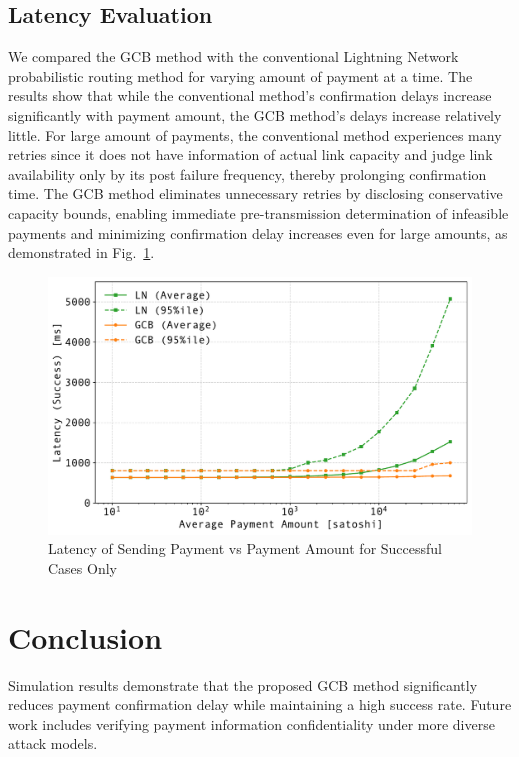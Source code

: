 \documentclass[conference]{IEEEtran}
\begin{document}
\subsection{Latency Evaluation}

We compared the GCB method with the conventional Lightning Network probabilistic routing method for varying amount of payment at a time.
The results show that while the conventional method's confirmation delays increase significantly with payment amount, the GCB method's delays increase relatively little.
For large amount of payments, the conventional method experiences many retries since it does not have information of actual link capacity and judge link availability only by its post failure frequency, thereby prolonging confirmation time.
The GCB method eliminates unnecessary retries by disclosing conservative capacity bounds, enabling immediate pre-transmission determination of infeasible payments and minimizing confirmation delay increases even for large amounts, as demonstrated in Fig.~\ref{fig:pmt_amt_vs_time}.

\begin{figure}[htbp]
	\centerline{\includegraphics[width=\linewidth]{fig/pmt_amt_vs_time}}
	\caption{Latency of Sending Payment vs Payment Amount for Successful Cases Only}
	\label{fig:pmt_amt_vs_time}
\end{figure}

\section{Conclusion}

Simulation results demonstrate that the proposed GCB method significantly reduces payment confirmation delay while maintaining a high success rate.
Future work includes verifying payment information confidentiality under more diverse attack models.
\end{document}
